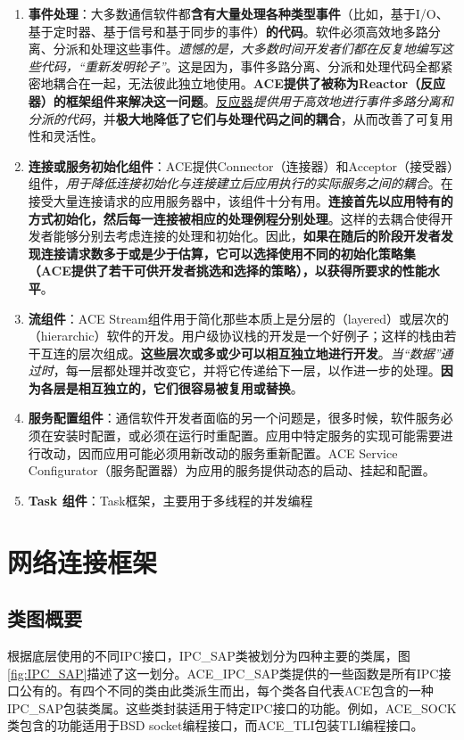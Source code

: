 \documentclass[UTF8,a4paper,12pt]{ctexbook}
\begin{document}
			\begin{enumerate}
				\item \textbf{事件处理}：大多数通信软件都\textbf{含有大量处理各种类型事件}（比如，基于I/O、基于定时器、基于信号和基于同步的事件）\textbf{的代码}。软件必须高效地多路分离、分派和处理这些事件。\textit{遗憾的是，大多数时间开发者们都在反复地编写这些代码，“重新发明轮子”}。这是因为，事件多路分离、分派和处理代码全都紧密地耦合在一起，无法彼此独立地使用。\textbf{ACE提供了被称为Reactor（反应器）的框架组件来解决这一问题}。\underline{反应器}\textit{提供用于高效地进行事件多路分离和分派的代码}，并\textbf{极大地降低了它们与处理代码之间的耦合}，从而改善了可复用性和灵活性。
				
				\item \textbf{连接或服务初始化组件}：ACE提供Connector（连接器）和Acceptor（接受器）组件，\textit{用于降低连接初始化与连接建立后应用执行的实际服务之间的耦合}。在接受大量连接请求的应用服务器中，该组件十分有用。\textbf{连接首先以应用特有的方式初始化，然后每一连接被相应的处理例程分别处理}。这样的去耦合使得开发者能够分别去考虑连接的处理和初始化。因此，\textbf{如果在随后的阶段开发者发现连接请求数多于或是少于估算，它可以选择使用不同的初始化策略集（ACE提供了若干可供开发者挑选和选择的策略），以获得所要求的性能水平}。
				
				\item \textbf{流组件}：ACE Stream组件用于简化那些本质上是分层的（layered）或层次的（hierarchic）软件的开发。用户级协议栈的开发是一个好例子；这样的栈由若干互连的层次组成。\textbf{这些层次或多或少可以相互独立地进行开发}。\textit{当“数据”通过时}，每一层都处理并改变它，并将它传递给下一层，以作进一步的处理。\textbf{因为各层是相互独立的，它们很容易被复用或替换}。
				
				\item \textbf{服务配置组件}：通信软件开发者面临的另一个问题是，很多时候，软件服务必须在安装时配置，或必须在运行时重配置。应用中特定服务的实现可能需要进行改动，因而应用可能必须用新改动的服务重新配置。ACE Service Configurator（服务配置器）为应用的服务提供动态的启动、挂起和配置。
				
				\item \textbf{Task 组件}：Task框架，主要用于多线程的并发编程
			\end{enumerate}
	


\chapter{网络连接框架} 
	\section{类图概要} 
		根据底层使用的不同IPC接口，IPC\_SAP类被划分为四种主要的类属，图\ref{fig:IPC_SAP}描述了这一划分。ACE\_IPC\_SAP类提供的一些函数是所有IPC接口公有的。有四个不同的类由此类派生而出，每个类各自代表ACE包含的一种IPC\_SAP包装类属。这些类封装适用于特定IPC接口的功能。例如，ACE\_SOCK类包含的功能适用于BSD socket编程接口，而ACE\_TLI包装TLI编程接口。 
		
\end{document}
